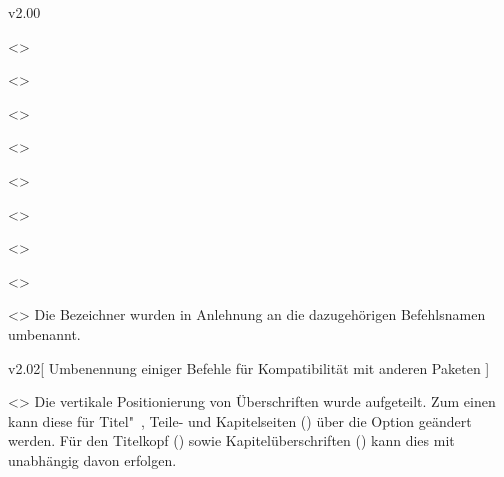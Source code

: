 \begin{Entity}{}
\begin{NoIndexDefault}
\begin{Cessations}{v2.00}
\begin{Entity}{}
\begin{Cessation}
  {}
  <>
\begin{Cessation}
  {}
  <>
\begin{Cessation}
  {}
  <>
\begin{Cessation}
  {}
  <>
\begin{Cessation}
  {}
  <>
\begin{Cessation}
  {}
  <>
\begin{Cessation}
  {}
  <>
\begin{Cessation}
  {}
  <>
\begin{Cessation}
  {}
  <>
\printdeclarationlist
%
Die Bezeichner wurden in Anlehnung an die dazugehörigen Befehlsnamen umbenannt.
\end{Cessation}
\end{Cessation}
\end{Cessation}
\end{Cessation}
\end{Cessation}
\end{Cessation}
\end{Cessation}
\end{Cessation}
\end{Cessation}
\end{Entity}
\end{Cessations}



\begin{Cessations}{v2.02}[%
  Umbenennung einiger Befehle für Kompatibilität mit anderen Paketen%
]
\begin{Cessation}
  {}
  <>
\printdeclarationlist
%
Die vertikale Positionierung von Überschriften wurde aufgeteilt. Zum einen kann 
diese für Titel"~, Teile- und Kapitelseiten () über 
die Option  geändert werden. Für den Titelkopf
() sowie Kapitelüberschriften 
() kann dies mit  unabhängig 
davon erfolgen.
\end{Cessation}


\end{Cessations}
\end{NoIndexDefault}
\end{Entity}
